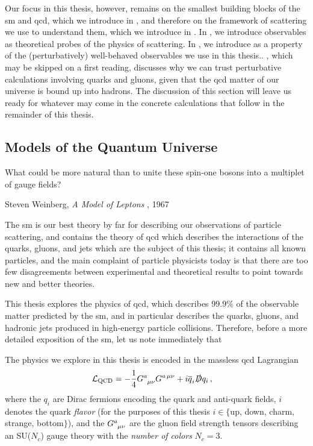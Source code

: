 Our focus in this thesis, however, remains on the smallest building blocks of the \gls{sm} and \gls{qcd}, which we introduce in , and therefore on the framework of \gls{scattering} we use to understand them, which we introduce in .
%
In , we introduce \glspl{observable} as theoretical probes of the physics of scattering.
%
In , we introduce  as a property of the (perturbatively) well-behaved \glspl{observable} we use in this thesis..
%
, which may be skipped on a first reading, discusses why we can trust perturbative calculations involving quarks and gluons, given that the \gls{qcd} matter of our universe is bound up into hadrons.
%
The discussion of this section will leave us ready for whatever may come in the concrete calculations that follow in the remainder of this thesis.


\subsection{Models of the Quantum Universe}
\label{sec:sm-qcd}

\epigraph{What could be more natural than to unite these spin-one bosons into a multiplet of gauge fields?}{Steven Weinberg, \textit{A Model of Leptons} \cite{Weinberg:1967tq}, 1967}

The \gls{sm} is our best theory by far for describing our observations of particle scattering, and contains the theory of \gls{qcd} which describes the interactions of the quarks, gluons, and jets which are the subject of this thesis;
%
it contains all known particles, and the main complaint of particle physicists today is that there are too few disagreements between experimental and theoretical results to point towards new and better theories.

This thesis explores the physics of \gls{qcd}, which describes \(99.9\%\) of the observable matter predicted by the \gls{sm}, and in particular describes the quarks, gluons, and hadronic jets produced in high-energy particle collisions.
%
Therefore, before a more detailed exposition of the \gls{sm}, let us note immediately that
\begin{answer}
    The physics we explore in this thesis is encoded in the massless \gls{qcd} Lagrangian
    \begin{align}
        \label{eq:qcd-lagrangian}
        \mathcal{L}_\text{QCD}
        &=
        - \frac{1}{4} G\indices{^a_{\mu\nu}} G^{a\,\mu\nu}
        +
        i \overline{q}_i \slashed{D} q_i
        \,,
    \end{align}
    where the \(q_i\) are Dirac fermions encoding the quark and anti-quark fields, \(i\) denotes the quark \textit{flavor} (for the purposes of this thesis \(i \in \{\)up, down, charm, strange, bottom\(\}\)), and the \(G\indices{^a_{\mu\nu}}\) are the gluon field strength tensors describing an SU(\(N_c\)) gauge theory with the \textit{number of colors} \(N_c = 3\).
\end{answer}

